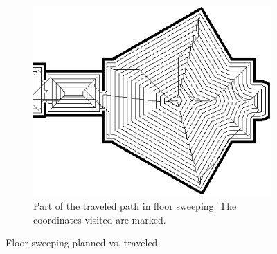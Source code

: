 \begin{figure}[ht]
\begin{subfigure}[t]{0.3\textwidth}
    \includegraphics[width = \textwidth]{graphics/floor_sweep_robot}
    \caption{Part of the traveled path in floor sweeping. The coordinates visited are marked.}
    \label{floor_sweep_robot}
  \end{subfigure}
\caption{Floor sweeping planned vs. traveled.}
\label{floor_sweeping_results}
\end{figure}